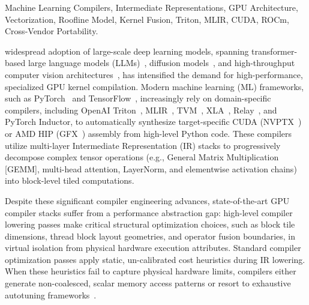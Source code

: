 \documentclass[10pt,journal,compsoc]{IEEEtran}
\begin{document}
{\begin{IEEEkeywords}
Machine Learning Compilers, Intermediate Representations, GPU Architecture, Vectorization, Roofline Model, Kernel Fusion, Triton, MLIR, CUDA, ROCm, Cross-Vendor Portability.
\end{IEEEkeywords}}

\maketitle

\IEEEdisplaynontitleabstractindextext
\IEEEpeerreviewmaketitle


 widespread adoption of large-scale deep learning models, spanning transformer-based large language models (LLMs)~\cite{vaswani2017attention, brown2020language, touvron2023llama}, diffusion models~\cite{rombach2022high}, and high-throughput computer vision architectures~\cite{dosovitskiy2020image}, has intensified the demand for high-performance, specialized GPU kernel compilation. Modern machine learning (ML) frameworks, such as PyTorch~\cite{paszke2019pytorch} and TensorFlow~\cite{abadi2016tensorflow}, increasingly rely on domain-specific compilers, including OpenAI Triton~\cite{tillet2019triton}, MLIR~\cite{lattner2021mlir}, TVM~\cite{chen2018tvm}, XLA~\cite{sabne2020xla}, Relay~\cite{roesch2019relay}, and PyTorch Inductor, to automatically synthesize target-specific CUDA (NVPTX~\cite{nvptx2023spec}) or AMD HIP (GFX~\cite{amd2023rdna}) assembly from high-level Python code. These compilers utilize multi-layer Intermediate Representation (IR) stacks to progressively decompose complex tensor operations (e.g., General Matrix Multiplication [GEMM], multi-head attention, LayerNorm, and elementwise activation chains) into block-level tiled computations.

Despite these significant compiler engineering advances, state-of-the-art GPU compiler stacks suffer from a performance abstraction gap: high-level compiler lowering passes make critical structural optimization choices, such as block tile dimensions, thread block layout geometries, and operator fusion boundaries, in virtual isolation from physical hardware execution attributes. Standard compiler optimization passes apply static, un-calibrated cost heuristics during IR lowering. When these heuristics fail to capture physical hardware limits, compilers either generate non-coalesced, scalar memory access patterns or resort to exhaustive autotuning frameworks~\cite{zheng2020ansor, ragan2013halide}. 
\end{document}
